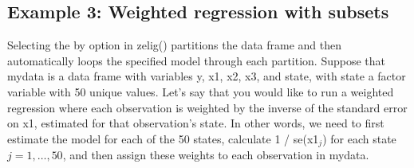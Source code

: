 \documentclass[letterpaper,10pt,english]{sphinxmanual}
\begin{document}
\subsection{Example 3: Weighted regression with subsets}
\label{7_programming_statements:example-3-weighted-regression-with-subsets}
Selecting the by option in zelig() partitions the data frame and then
automatically loops the specified model through each partition. Suppose
that mydata is a data frame with variables y, x1, x2, x3, and state,
with state a factor variable with 50 unique values. Let’s say that you
would like to run a weighted regression where each observation is
weighted by the inverse of the standard error on x1, estimated for that
observation’s state. In other words, we need to first estimate the model
for each of the 50 states, calculate 1 / se(x1\(_j\)) for each
state \(j = 1, \dots, 50\), and then assign these weights to each
observation in mydata.
\end{document}
